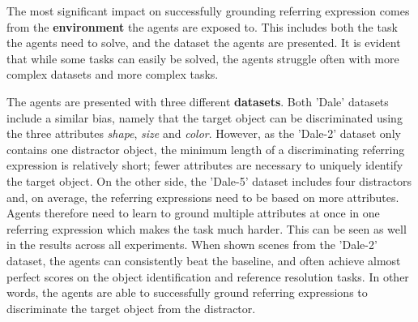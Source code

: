 The most significant impact on successfully grounding referring expression comes from the \textbf{environment} the agents are exposed to.
This includes both the task the agents need to solve, and the dataset the agents are presented.
It is evident that while some tasks can easily be solved, the agents struggle often with more complex datasets and more complex tasks.

The agents are presented with three different \textbf{datasets}.
Both 'Dale' datasets include a similar bias, namely that the target object can be discriminated using the three attributes \emph{shape}, \emph{size} and \emph{color}.
However, as the 'Dale-2' dataset only contains one distractor object, the minimum length of a discriminating referring expression is relatively short; fewer attributes are necessary to uniquely identify the target object.
On the other side, the 'Dale-5' dataset includes four distractors and, on average, the referring expressions need to be based on more attributes.
Agents therefore need to learn to ground multiple attributes at once in one referring expression which makes the task much harder.
This can be seen as well in the results across all experiments.
When shown scenes from the 'Dale-2' dataset, the agents can consistently beat the baseline, and often achieve almost perfect scores on the object identification and reference resolution tasks.
In other words, the agents are able to successfully ground referring expressions to discriminate the target object from the distractor.

